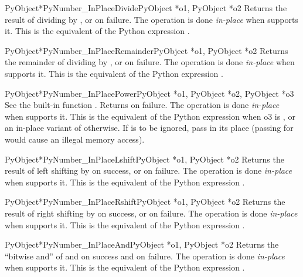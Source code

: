 \documentclass{manual}
\begin{document}
\begin{cfuncdesc}{PyObject*}{PyNumber_InPlaceDivide}{PyObject *o1, PyObject *o2}
Returns the result of dividing  by , or \NULL{} on failure. 
The operation is done \emph{in-place} when  supports it. This is the
equivalent of the Python expression .
\end{cfuncdesc}


\begin{cfuncdesc}{PyObject*}{PyNumber_InPlaceRemainder}{PyObject *o1, PyObject *o2}
Returns the remainder of dividing  by , or \NULL{} on
failure.  The operation is done \emph{in-place} when  supports it. 
This is the equivalent of the Python expression .
\end{cfuncdesc}


\begin{cfuncdesc}{PyObject*}{PyNumber_InPlacePower}{PyObject *o1, PyObject *o2, PyObject *o3}
See the built-in function .  Returns
\NULL{} on failure.  The operation is done \emph{in-place} when 
supports it.  This is the equivalent of the Python expression  when o3 is , or an in-place variant of
 otherwise. If  is to be
ignored, pass  in its place (passing \NULL{} for 
would cause an illegal memory access).
\end{cfuncdesc}

\begin{cfuncdesc}{PyObject*}{PyNumber_InPlaceLshift}{PyObject *o1, PyObject *o2}
Returns the result of left shifting  by  on success, or
\NULL{} on failure.  The operation is done \emph{in-place} when 
supports it.  This is the equivalent of the Python expression .
\end{cfuncdesc}


\begin{cfuncdesc}{PyObject*}{PyNumber_InPlaceRshift}{PyObject *o1, PyObject *o2}
Returns the result of right shifting  by  on success, or
\NULL{} on failure.  The operation is done \emph{in-place} when 
supports it.  This is the equivalent of the Python expression .
\end{cfuncdesc}


\begin{cfuncdesc}{PyObject*}{PyNumber_InPlaceAnd}{PyObject *o1, PyObject *o2}
Returns the ``bitwise and'' of  and  on success
and \NULL{} on failure. The operation is done \emph{in-place} when 
supports it.  This is the equivalent of the Python expression .
\end{cfuncdesc}
\end{document}
